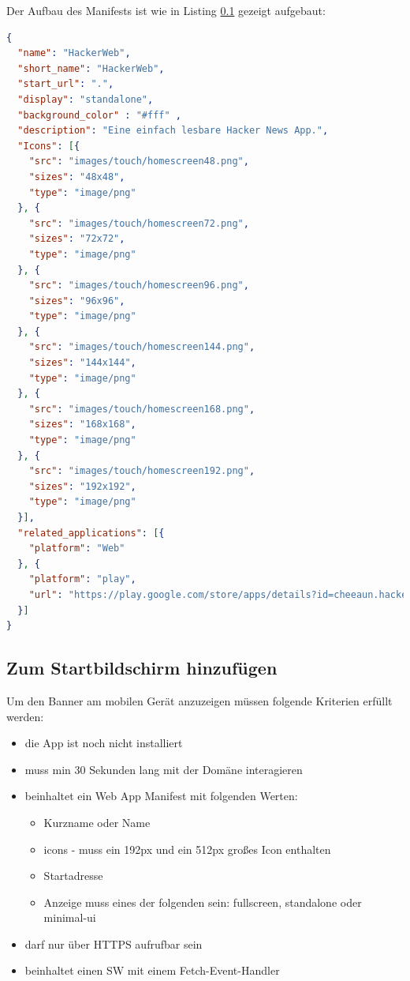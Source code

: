 \newpage
Der Aufbau des Manifests ist wie in Listing \ref{} gezeigt aufgebaut:
\begin{lstlisting}[language=json, firstnumber=1, caption={Manifest in das Projekt implementieren},label=lst:Manifest.json, xleftmargin=50pt]
{
  "name": "HackerWeb",
  "short_name": "HackerWeb",
  "start_url": ".",
  "display": "standalone",
  "background_color" : "#fff" ,
  "description": "Eine einfach lesbare Hacker News App.",
  "Icons": [{
    "src": "images/touch/homescreen48.png",
    "sizes": "48x48",
    "type": "image/png"
  }, {
    "src": "images/touch/homescreen72.png",
    "sizes": "72x72",
    "type": "image/png"
  }, {
    "src": "images/touch/homescreen96.png",
    "sizes": "96x96",
    "type": "image/png"
  }, {
    "src": "images/touch/homescreen144.png",
    "sizes": "144x144",
    "type": "image/png"
  }, {
    "src": "images/touch/homescreen168.png",
    "sizes": "168x168",
    "type": "image/png"
  }, {
    "src": "images/touch/homescreen192.png",
    "sizes": "192x192",
    "type": "image/png"
  }],
  "related_applications": [{
    "platform": "Web"
  }, {
    "platform": "play",
    "url": "https://play.google.com/store/apps/details?id=cheeaun.hackerweb"
  }]
}
\end{lstlisting}\cite{Manifest}

\subsection{Zum Startbildschirm hinzufügen}
Um den Banner am mobilen Gerät anzuzeigen müssen folgende Kriterien erfüllt werden:


\begin{itemize}
    \item  die App ist noch nicht installiert
	\item  muss min 30 Sekunden lang mit der Domäne interagieren
	\item  beinhaltet ein Web App Manifest mit folgenden Werten:
		 \begin{itemize}
         \item Kurzname oder Name
         \item icons - muss ein 192px und ein 512px großes Icon enthalten
         \item Startadresse
         \item Anzeige muss eines der folgenden sein: fullscreen, standalone oder \\ minimal-ui
      	\end{itemize}
    \item 	darf nur über HTTPS aufrufbar sein
    \item beinhaltet einen \acl{SW} mit einem Fetch-Event-Handler
\end{itemize}

